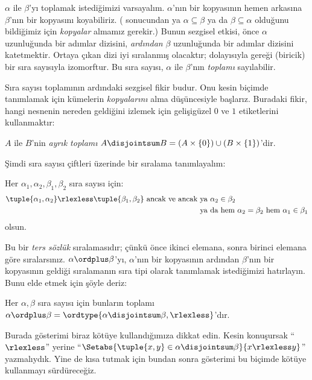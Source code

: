 \documentclass[../../../include/open-logic-section]{subfiles}
\begin{document}

$\alpha$ ile $\beta$'yı toplamak istediğimizi varsayalım. $\alpha$'nın bir
kopyasının hemen arkasına $\beta$'nın bir {kopyasını} koyabiliriz.
( sonucundan ya
$\alpha\subseteq\beta$ ya da $\beta\subseteq\alpha$ olduğunu bildiğimiz
için 
\emph{kopyalar} almamız gerekir.) Bunun sezgisel etkisi, önce
$\alpha$ uzunluğunda bir adımlar dizisini, 
\emph{ardından} $\beta$
uzunluğunda bir adımlar dizisini katetmektir. Ortaya çıkan dizi iyi
sıralanmış olacaktır; dolayısıyla
 gereği (biricik) bir
sıra sayısıyla izomorftur. Bu sıra sayısı, $\alpha$ ile $\beta$'nın
\emph{toplamı} sayılabilir.

Sıra sayısı toplamının ardındaki sezgisel fikir budur. Onu kesin biçimde
tanımlamak için kümelerin \emph{kopyalarını} alma düşüncesiyle başlarız.
Buradaki fikir, hangi nesnenin nereden geldiğini izlemek için gelişigüzel
$0$ ve $1$ etiketlerini kullanmaktır:

\begin{defn}
$A$ ile $B$'nin 
\emph{ayrık toplamı}
$A\disjointsum B=(A\times\{0\})\cup(B\times\{1\})$'dir.
\end{defn}

Şimdi sıra sayısı çiftleri üzerinde bir sıralama tanımlayalım:

\begin{defn}
Her $\alpha_1,\alpha_2,\beta_1,\beta_2$ sıra sayısı için:
\begin{align*}
	\tuple{\alpha_1, \alpha_2} \rlexless \tuple{\beta_1, \beta_2}
	\text{ ancak ve ancak }& 
	\text{ya $\alpha_2 \in \beta_2$}\\
	& \text{ya da hem $\alpha_2 = \beta_2$ hem $\alpha_1 \in \beta_1$}
\end{align*}
olsun.
\end{defn}

Bu bir 
\emph{ters sözlük} sıralamasıdır; çünkü önce ikinci elemana, sonra
birinci elemana göre sıralarsınız. $\alpha\ordplus\beta$'yı,
$\alpha$'nın bir kopyasının ardından $\beta$'nın bir kopyasının geldiği
sıralamanın sıra tipi olarak tanımlamak istediğimizi hatırlayın. Bunu elde
etmek için şöyle deriz:

\begin{defn}
Her $\alpha,\beta$ sıra sayısı için bunların toplamı
$\alpha\ordplus\beta=\ordtype{\alpha\disjointsum\beta,\rlexless}$'dır.
\end{defn}
\noindent
Burada gösterimi biraz kötüye kullandığımıza dikkat edin. Kesin konuşursak
``$\rlexless$'' yerine
``$\Setabs{\tuple{x,y}\in\alpha\disjointsum\beta}{x\rlexless y}$''
yazmalıydık. Yine de kısa tutmak için bundan sonra gösterimi bu biçimde
kötüye kullanmayı sürdüreceğiz.
\end{document}
